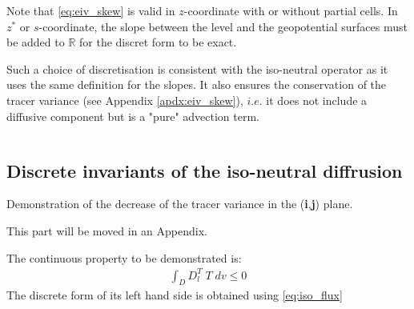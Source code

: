 \documentclass[../tex_main/NEMO_manual]{subfiles}
\begin{document}
Note that \autoref{eq:eiv_skew} is valid in $z$-coordinate with or without partial cells. 
In $z^*$ or $s$-coordinate, the slope between the level and the geopotential surfaces must be added to
$\mathbb{R}$ for the discret form to be exact. 

Such a choice of discretisation is consistent with the iso-neutral operator as
it uses the same definition for the slopes.
It also ensures the conservation of the tracer variance (see Appendix \autoref{apdx:eiv_skew}),
$i.e.$ it does not include a diffusive component but is a "pure" advection term.




$\ $\newpage      %
\subsection{Discrete invariants of the iso-neutral diffrusion}
\label{subsec:Gf_operator}

Demonstration of the decrease of the tracer variance in the (\textbf{i},\textbf{j}) plane. 

This part will be moved in an Appendix.

The continuous property to be demonstrated is:
\begin{align*}
\int_D  D_l^T \; T \;dv   \leq 0
\end{align*}
The discrete form of its left hand side is obtained using \autoref{eq:iso_flux}
\end{document}
